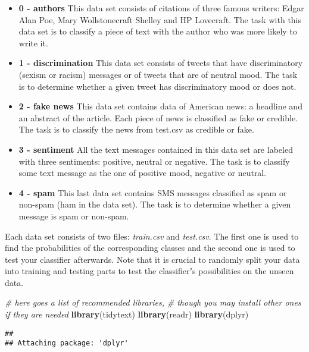 \documentclass[
]{article}
\newenvironment{Shaded}{\begin{snugshade}}{\end{snugshade}}
\newcommand{\CommentTok}[1]{\textcolor[rgb]{0.56,0.35,0.01}{\textit{#1}}}
\newcommand{\FunctionTok}[1]{\textcolor[rgb]{0.13,0.29,0.53}{\textbf{#1}}}
\newcommand{\NormalTok}[1]{#1}
\begin{document}
\begin{itemize}
\item
  \textbf{0 - authors} This data set consists of citations of three
  famous writers: Edgar Alan Poe, Mary Wollstonecraft Shelley and HP
  Lovecraft. The task with this data set is to classify a piece of text
  with the author who was more likely to write it.
\item
  \textbf{1 - discrimination} This data set consists of tweets that have
  discriminatory (sexism or racism) messages or of tweets that are of
  neutral mood. The task is to determine whether a given tweet has
  discriminatory mood or does not.
\item
  \textbf{2 - fake news} This data set contains data of American news: a
  headline and an abstract of the article. Each piece of news is
  classified as fake or credible. The task is to classify the news from
  test.csv as credible or fake.
\item
  \textbf{3 - sentiment} All the text messages contained in this data
  set are labeled with three sentiments: positive, neutral or negative.
  The task is to classify some text message as the one of positive mood,
  negative or neutral.
\item
  \textbf{4 - spam} This last data set contains SMS messages classified
  as spam or non-spam (ham in the data set). The task is to determine
  whether a given message is spam or non-spam.
\end{itemize}

Each data set consists of two files: \emph{train.csv} and
\emph{test.csv}. The first one is used to find the probabilities of the
corresponding classes and the second one is used to test your classifier
afterwards. Note that it is crucial to randomly split your data into
training and testing parts to test the classifierʼs possibilities on the
unseen data.

\begin{Shaded}
\begin{Highlighting}[]
\CommentTok{\# here goes a list of recommended libraries,}
\CommentTok{\# though you may install other ones if they are needed}
\FunctionTok{library}\NormalTok{(tidytext)}
\FunctionTok{library}\NormalTok{(readr)}
\FunctionTok{library}\NormalTok{(dplyr)}
\end{Highlighting}
\end{Shaded}

\begin{verbatim}
## 
## Attaching package: 'dplyr'
\end{verbatim}
\end{document}
